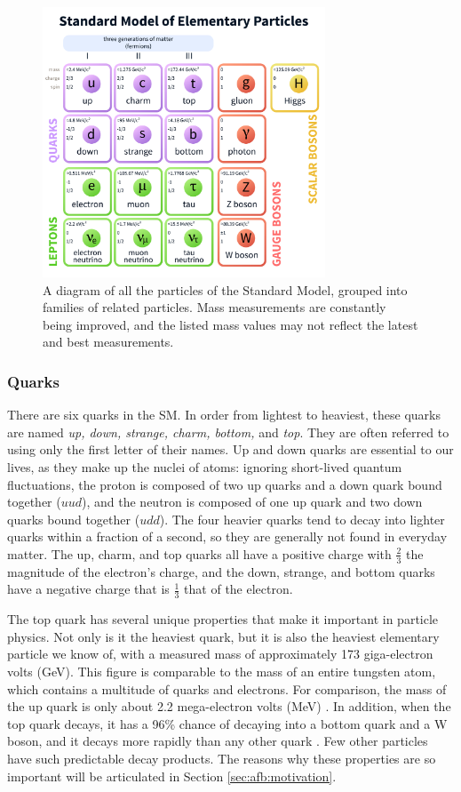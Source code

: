 \begin{figure}[h]
  \centering
  \includegraphics[width=0.75\textwidth]{figures/standard-model-light.pdf}
  \caption{A diagram of all the particles of the Standard Model, grouped into
  families of related particles. Mass measurements are constantly
  being improved, and the listed mass values may not reflect the latest and
  best measurements.}
  \label{fig:standardmodel}
\end{figure}

\subsubsection*{Quarks}
There are six quarks in the SM. In order from lightest to heaviest,
these quarks are named \emph{up, down, strange, charm, bottom,} and
\emph{top}. They are often referred to using only the first letter of
their names. Up and down quarks are essential to our lives, as
they make up the nuclei of atoms: ignoring short-lived quantum
fluctuations, the proton is composed of two up
quarks and a down quark bound together ($uud$), and the neutron is composed of one up
quark and two down quarks bound together ($udd$). The four heavier
quarks tend to decay into lighter quarks within a fraction of a
second, so they are generally not found in everyday matter. The up,
charm, and top quarks all have a positive charge with $\frac{2}{3}$ the
magnitude of the electron's charge, and the down, strange, and bottom
quarks have a negative charge that is $\frac{1}{3}$ that of the electron.

The top quark has several unique properties that make it important
in particle physics. Not only is
it the heaviest quark, but it is also the heaviest elementary particle
we know of, with a measured mass of approximately 173 giga-electron
volts (GeV). This figure is comparable to the mass
of an entire tungsten atom, which contains a multitude of quarks and
electrons. For comparison, the mass of the up quark is only about
2.2 mega-electron volts (MeV) \cite{pdg}.
In addition, when the top quark decays, it has a 96\% chance of
decaying into a bottom quark and a W boson, and it decays
more rapidly than any other quark \cite{pdg}. Few other
particles have such predictable decay products. The reasons why these
properties are so important will be articulated in Section \ref{sec:afb:motivation}.

